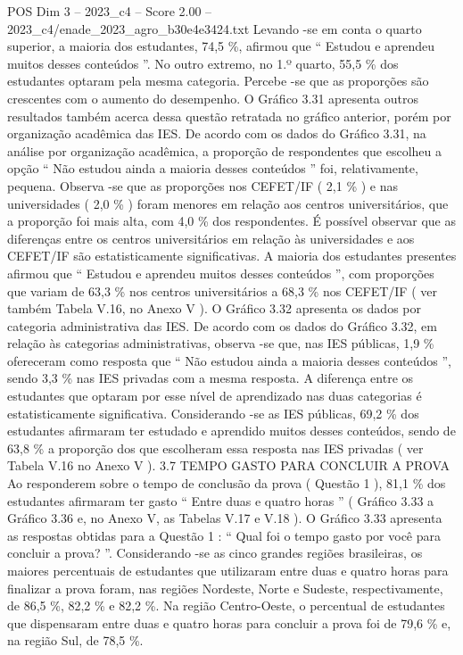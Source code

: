 \begin{textsample}{POS Dim 3 – 2023\_c4 – Score 2.00 – 2023\_c4/enade\_2023\_agro\_b30e4e3424.txt}
Levando -se em conta o quarto superior, a maioria dos estudantes, 74,5 \%, afirmou que “ Estudou e aprendeu muitos desses conteúdos ”.
No outro extremo, no 1.º quarto, 55,5 \% dos estudantes optaram pela mesma categoria.
Percebe -se que as proporções são crescentes com o aumento do desempenho.
O Gráfico 3.31 apresenta outros resultados também acerca dessa questão retratada no gráfico anterior, porém por organização acadêmica das IES.
De acordo com os dados do Gráfico 3.31, na análise por organização acadêmica, a proporção de respondentes que escolheu a opção “ Não estudou ainda a maioria desses conteúdos ” foi, relativamente, pequena.
Observa -se que as proporções nos CEFET/IF ( 2,1 \% ) e nas universidades ( 2,0 \% ) foram menores em relação aos centros universitários, que a proporção foi mais alta, com 4,0 \% dos respondentes.
É possível observar que as diferenças entre os centros universitários em relação às universidades e aos CEFET/IF são estatisticamente significativas.
A maioria dos estudantes presentes afirmou que “ Estudou e aprendeu muitos desses conteúdos ”, com proporções que variam de 63,3 \% nos centros universitários a 68,3 \% nos CEFET/IF ( ver também Tabela V.16, no Anexo V ).
O Gráfico 3.32 apresenta os dados por categoria administrativa das IES.
De acordo com os dados do Gráfico 3.32, em relação às categorias administrativas, observa -se que, nas IES públicas, 1,9 \% ofereceram como resposta que “ Não estudou ainda a maioria desses conteúdos ”, sendo 3,3 \% nas IES privadas com a mesma resposta.
A diferença entre os estudantes que optaram por esse nível de aprendizado nas duas categorias é estatisticamente significativa.
Considerando -se as IES públicas, 69,2 \% dos estudantes afirmaram ter estudado e aprendido muitos desses conteúdos, sendo de 63,8 \% a proporção dos que escolheram essa resposta nas IES privadas ( ver Tabela V.16 no Anexo V ). 3.7 TEMPO GASTO PARA CONCLUIR A PROVA Ao responderem sobre o tempo de conclusão da prova ( Questão 1 ), 81,1 \% dos estudantes afirmaram ter gasto “ Entre duas e quatro horas ” ( Gráfico 3.33 a Gráfico 3.36 e, no Anexo V, as Tabelas V.17 e V.18 ).
O Gráfico 3.33 apresenta as respostas obtidas para a Questão 1 : “ Qual foi o tempo gasto por você para concluir a prova? ”.
Considerando -se as cinco grandes regiões brasileiras, os maiores percentuais de estudantes que utilizaram entre duas e quatro horas para finalizar a prova foram, nas regiões Nordeste, Norte e Sudeste, respectivamente, de 86,5 \%, 82,2 \% e 82,2 \%.
Na região Centro-Oeste, o percentual de estudantes que dispensaram entre duas e quatro horas para concluir a prova foi de 79,6 \% e, na região Sul, de 78,5 \%.

\end{textsample}
